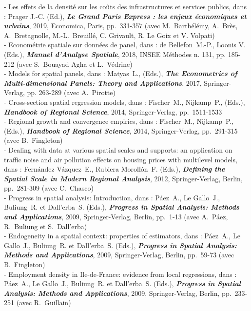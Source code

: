 \documentclass[a4paper,12pt]{article}
\begin{document}
- Les effets de la densité sur les coûts des infrastructures et services publics, dans : Prager J.-C. (Ed.), \textit{\textbf{Le Grand Paris Express : les enjeux économiques et urbains}}, 2019, Economica, Paris, pp.~331-357 (avec M.~Barthélémy, A.~Brès, A.~Bretagnolle, M.-L.~Breuillé, C. Grivault, R. Le Goix et V. Volpati) \\
- Econométrie spatiale sur données de panel, dans : de Bellefon~M.-P., Loonis V. (Eds.), \textit{\textbf{Manuel d'Analyse Spatiale}}, 2018, INSEE Méthodes n. 131, pp. 185-212 (avec S.~Bouayad Agha et L.~Védrine) \\
 - Models for spatial panels, dans : Matyas~L., (Eds.), \textit{\textbf{The Econometrics of Multi-dimensional Panels: Theory and Applications}}, 2017, Springer-Verlag, pp. 263-289 (avec A.~Pirotte) \\
- Cross-section spatial regression models, dans : Fischer~M., Nijkamp~P., (Eds.), \textit{\textbf{Handbook of Regional Science}}, 2014, Springer-Verlag, pp.~1511-1533 \\
- Regional growth and convergence empirics, dans : Fischer~M., Nijkamp~P., (Eds.), \textit{\textbf{Handbook of Regional Science}}, 2014, Springer-Verlag, pp.~291-315 (avec B.~Fingleton) \\
- Dealing with data at various spatial scales and supports: an application on traffic noise and air pollution effects on housing prices with multilevel models, dans : Fernández Vázquez~E., Rubiera Morollón~F. (Eds.), \textit{\textbf{Defining the Spatial Scale in Modern Regional Analysis}}, 2012, Springer-Verlag, Berlin, pp.~281-309 (avec C.~Chasco) \\
- Progress in spatial analysis: Introduction, dans : Páez~A., Le Gallo~J., Buliung~R. et Dall'erba~S. (Eds.), \textit{\textbf{Progress in Spatial Analysis: Methods and Applications}}, 2009, Springer-Verlag, Berlin, pp.~1-13 (avec A.~Páez, R.~Buliung et S.~Dall'erba) \\
- Endogeneity in a spatial context: properties of estimators, dans : Páez~A., Le Gallo~J., Buliung~R. et Dall'erba~S. (Eds.), \textit{\textbf{Progress in Spatial Analysis: Methods and Applications}}, 2009, Springer-Verlag, Berlin, pp.~59-73 (avec B.~Fingleton) \\
- Employment density in Ile-de-France: evidence from local regressions, dans : Páez~A., Le Gallo~J., Buliung~R. et Dall'erba~S. (Eds.), \textit{\textbf{Progress in Spatial Analysis: Methods and Applications}}, 2009, Springer-Verlag, Berlin, pp.~233-251 (avec R.~Guillain) \\
\end{document}
